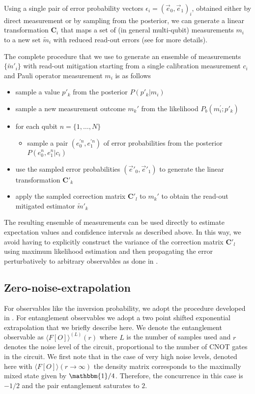 \documentclass[Dual]{msu-thesis}
\begin{document}
Using a single pair of error probability vectors $\epsilon_i=(\vec{e}_0,\vec{e}_1)_i$, obtained either by direct measurement or by sampling from the posterior, we can generate a linear transformation $\mathbf{C}_i$ that maps a set of (in general multi-qubit) measurements $m_i$ to a new set $\widetilde{m}_i$ with reduced read-out errors (see \cite{Roggero_nptodg} for more details).

The complete procedure that we use to generate an ensemble of measurements $\{\widetilde{m}'_i\}$ with read-out mitigation starting from a single calibration measurement $c_i$ and Pauli operator measurement $m_i$ is as follows
\begin{itemize}
    \item sample a value $p'_k$ from the posterior $P(p'_k\lvert m_i)$ 
	\item sample a new measurement outcome $m_k'$ from the likelihood $P_b(m_i^\prime;p'_k)$
	\item for each qubit $n=\{1,\dots,N\}$
	\begin{itemize}
	    \item sample a pair $(e^{\prime n}_0,e^{\prime n}_1)$ of error probabilities from the posterior $P(e^n_0,e^n_1|c_i)$ 
	\end{itemize}
	\item use the sampled error probabilities $(\vec{e}'_0,\vec{e}'_1)$ to generate the linear transformation $\mathbf{C}'_k$ 
	\item apply the sampled correction matrix $\mathbf{C}'_l$ to $m_k'$ to obtain the read-out mitigated estimator $\widetilde{m}'_k$
\end{itemize}

The resulting ensemble of measurements can be used directly to estimate expectation values and confidence intervals as described above. In this way, we avoid having to explicitly construct the variance of the correction matrix $\mathbf{C}'_l$ using maximum likelihood estimation and then propagating the error perturbatively to arbitrary observables as done in \cite{Roggero_nptodg}.

\subsection{Zero-noise-extrapolation}
For observables like the inversion probability, we adopt the procedure developed in \cite{Roggero_nptodg}. For entanglement observables we adopt a two point shifted exponential extrapolation that we briefly describe here. We denote the entanglement observable as $\langle F[O]\rangle^{(L)}(r)$ where $L$ is the number of samples used and $r$ denotes the noise level of the circuit, proportional to the number of CNOT gates in the circuit. We first note that in the case of very high noise levels, denoted here with $\langle F[O]\rangle(r\rightarrow\infty)$ the density matrix corresponds to the maximally mixed state given by $\mathbbm{1}/4$. Therefore, the concurrence in this case is $-1/2$ and the pair entanglement saturates to $2$.
\end{document}
